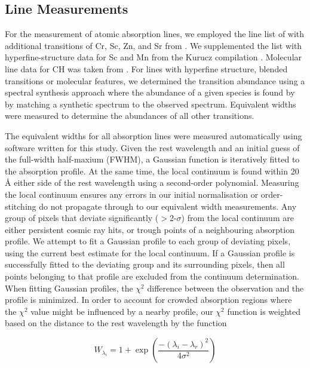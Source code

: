 \documentclass{emulateapj}
\begin{document}
\subsection{Line Measurements}
\label{sec:line-measurements}

For the measurement of atomic absorption lines, we employed the line list of \citet{yong;et-al_2005} with additional transitions of Cr, Sc, Zn, and Sr from \citet{frebel;et-al_2010}. We supplemented the list with hyperfine-structure data for Sc and Mn from the Kurucz compilation \citet{kurucz;1998}. Molecular line data for CH was taken from \citet{plez;et-al_2008,plez;et-al_2009}. For lines with hyperfine structure, blended transitions or molecular features, we determined the transition abundance using a spectral synthesis approach where the abundance of a given species is found by by matching a synthetic spectrum to the observed spectrum. Equivalent widths were measured to determine the abundances of all other transitions.

The equivalent widths for all absorption lines were measured automatically using software written for this study. Given the rest wavelength and an initial guess of the full-width half-maxium (FWHM), a Gaussian function is iteratively fitted to the absorption profile. At the same time, the local continuum is found within 20\,\AA{} either side of the rest wavelength using a second-order polynomial. Measuring the local continuum ensures any errors in our initial normalisation or order-stitching do not propagate through to our equivalent width measurements. Any group of pixels that deviate significantly ($>$2-$\sigma$) from the local continuum are either persistent cosmic ray hits, or trough points of a neighbouring absorption profile. We attempt to fit a Gaussian profile to each group of deviating pixels, using the current best estimate for the local continuum. If a Gaussian profile is successfully fitted to the deviating group and its surrounding pixels, then all points belonging to that profile are excluded from the continuum determination. When fitting Gaussian profiles, the $\chi^2$ difference between the observation and the profile is minimized. In order to account for crowded absorption regions where the $\chi^2$ value might be influenced by a nearby profile, our $\chi^2$ function is weighted based on the distance to the rest wavelength by the function

\begin{equation}
W_{\lambda_{i}} = 1 + \exp{\left(\frac{-(\lambda_{i} - \lambda_{r})^2}{4\sigma^2}\right)}
\label{eq:chi-weight}
\end{equation}
\end{document}
